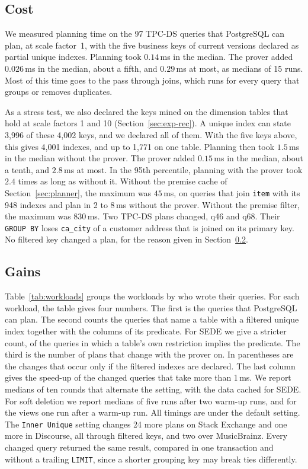 \documentclass[conference]{IEEEtran}
\theoremstyle{definition}
\newcommand{\sql}[1]{\texttt{#1}}
\begin{document}
\subsection{Cost}\label{sec:exp-cost}

We measured planning time on the 97 TPC-DS queries that PostgreSQL can plan, at scale factor~1, with the five
business keys of current versions declared as partial unique indexes. Planning took $0.14$\,ms in the median. The prover
added $0.026$\,ms in the median, about a fifth, and $0.29$\,ms at most, as medians of 15 runs. Most of this time goes to
the pass through joins, which runs for every query that groups or removes duplicates.

As a stress test, we also declared the keys mined on the dimension tables that hold at scale factors 1 and 10
(Section~\ref{sec:exp-rec}). A unique index can state 3{,}996 of these 4{,}002 keys, and we declared all of them. With
the five keys above, this gives 4{,}001 indexes, and up to 1{,}771 on one table. Planning then took $1.5$\,ms in the median
without the prover. The prover added $0.15$\,ms in the median, about a tenth, and $2.8$\,ms at most. In the 95th
percentile, planning with the prover took $2.4$ times as long as without it. Without the premise cache of
Section~\ref{sec:planner}, the maximum was $45$\,ms, on queries that join \sql{item} with its 948 indexes and plan in 2 to
8\,ms without the prover. Without the premise filter, the maximum was $830$\,ms. Two TPC-DS plans changed, q46 and q68.
Their \sql{GROUP BY} loses \sql{ca\_city} of a customer address that is joined on its primary key. No filtered key changed a
plan, for the reason given in Section~\ref{sec:exp-gain}.

\subsection{Gains}\label{sec:exp-gain}

Table~\ref{tab:workloads} groups the workloads by who wrote their queries. For each workload, the table gives four
numbers. The first is the queries that PostgreSQL can plan. The second counts the queries that name a table
with a filtered unique index together with the columns of its predicate. For SEDE we give a stricter count, of the
queries in which a table's own restriction implies the predicate. The third is the number of plans that change with the
prover on. In parentheses are the changes that occur only if the filtered indexes are declared. The last column gives
the speed-up of the changed queries that take more than 1\,ms. We report medians of ten rounds that alternate the
setting, with the data cached for SEDE. For soft deletion we report medians of five runs after two warm-up runs, and for
the views one run after a warm-up run. All timings are under the default setting. The \sql{Inner Unique} setting changes
24 more plans on Stack Exchange and one more in Discourse, all through filtered keys, and two over MusicBrainz. Every
changed query returned the same result, compared in one transaction and without a trailing \sql{LIMIT}, since a
shorter grouping key may break ties differently.
\end{document}
